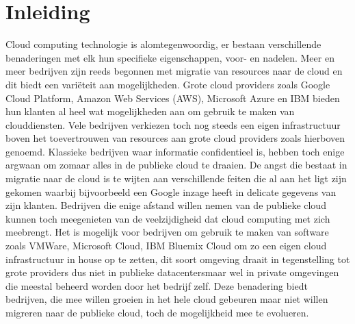 
\chapter{Inleiding}
\label{ch:inleiding}

Cloud computing technologie is alomtegenwoordig, er bestaan verschillende benaderingen met elk hun specifieke eigenschappen, voor- en nadelen. Meer en meer bedrijven zijn reeds begonnen met migratie van resources naar de cloud en dit biedt een variëteit aan mogelijkheden. Grote cloud providers zoals Google Cloud Platform, Amazon Web Services (AWS), Microsoft Azure en IBM bieden hun klanten al heel wat mogelijkheden aan om gebruik te maken van clouddiensten. Vele bedrijven verkiezen toch nog steeds een eigen infrastructuur boven het toevertrouwen van resources aan grote cloud providers zoals hierboven genoemd. Klassieke bedrijven waar informatie confidentieel is, hebben toch enige argwaan om zomaar alles in de publieke cloud te draaien. De angst die bestaat in migratie naar de cloud is te wijten aan verschillende feiten die al aan het ligt zijn gekomen waarbij bijvoorbeeld een Google inzage heeft in delicate gegevens van zijn klanten. Bedrijven die enige afstand willen nemen van de publieke cloud kunnen toch meegenieten van de veelzijdigheid dat cloud computing met zich meebrengt. Het is mogelijk voor bedrijven om gebruik te maken van software zoals VMWare, Microsoft Cloud, IBM Bluemix Cloud om zo een eigen cloud infrastructuur in house op te zetten, dit soort omgeving draait in tegenstelling tot grote providers dus niet in publieke datacentersmaar wel in private omgevingen die meestal beheerd worden door het bedrijf zelf. Deze benadering biedt bedrijven, die mee willen groeien in het hele cloud gebeuren maar niet willen migreren naar de publieke cloud, toch de mogelijkheid mee te evolueren.
\\\\

